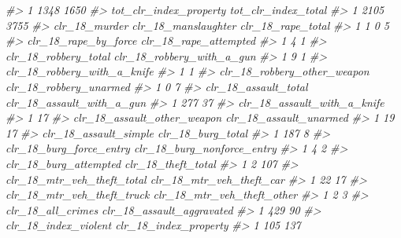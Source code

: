 \documentclass[
]{krantz}
\makeatletter
\newenvironment{Shaded}{\begin{snugshade}}{\end{snugshade}}
\newcommand{\CommentTok}[1]{\textcolor[rgb]{0.37,0.37,0.37}{\textit{#1}}}
\newenvironment{kframe}{%
\medskip{}
\setlength{\fboxsep}{.8em}
 \def\at@end@of@kframe{}%
 \ifinner\ifhmode%
  \def\at@end@of@kframe{\end{minipage}}%
  \begin{minipage}{\columnwidth}%
 \fi\fi%
 \def\FrameCommand##1{\hskip\@totalleftmargin \hskip-\fboxsep
 \colorbox{shadecolor}{##1}\hskip-\fboxsep
     \hskip-\linewidth \hskip-\@totalleftmargin \hskip\columnwidth}%
 \MakeFramed {\advance\hsize-\width
   \@totalleftmargin\z@ \linewidth\hsize
   \@setminipage}}%
 {\par\unskip\endMakeFramed%
 \at@end@of@kframe}
\renewenvironment{Shaded}{\begin{kframe}}{\end{kframe}}
\makeatother
\begin{document}
\begin{Shaded}
\begin{Highlighting}[]
\CommentTok{\#\textgreater{} 1                       1348                  1650}
\CommentTok{\#\textgreater{}   tot\_clr\_index\_property tot\_clr\_index\_total}
\CommentTok{\#\textgreater{} 1                   2105                3755}
\CommentTok{\#\textgreater{}   clr\_18\_murder clr\_18\_manslaughter clr\_18\_rape\_total}
\CommentTok{\#\textgreater{} 1             1                   0                 5}
\CommentTok{\#\textgreater{}   clr\_18\_rape\_by\_force clr\_18\_rape\_attempted}
\CommentTok{\#\textgreater{} 1                    4                     1}
\CommentTok{\#\textgreater{}   clr\_18\_robbery\_total clr\_18\_robbery\_with\_a\_gun}
\CommentTok{\#\textgreater{} 1                    9                         1}
\CommentTok{\#\textgreater{}   clr\_18\_robbery\_with\_a\_knife}
\CommentTok{\#\textgreater{} 1                           1}
\CommentTok{\#\textgreater{}   clr\_18\_robbery\_other\_weapon clr\_18\_robbery\_unarmed}
\CommentTok{\#\textgreater{} 1                           0                      7}
\CommentTok{\#\textgreater{}   clr\_18\_assault\_total clr\_18\_assault\_with\_a\_gun}
\CommentTok{\#\textgreater{} 1                  277                        37}
\CommentTok{\#\textgreater{}   clr\_18\_assault\_with\_a\_knife}
\CommentTok{\#\textgreater{} 1                          17}
\CommentTok{\#\textgreater{}   clr\_18\_assault\_other\_weapon clr\_18\_assault\_unarmed}
\CommentTok{\#\textgreater{} 1                          19                     17}
\CommentTok{\#\textgreater{}   clr\_18\_assault\_simple clr\_18\_burg\_total}
\CommentTok{\#\textgreater{} 1                   187                 8}
\CommentTok{\#\textgreater{}   clr\_18\_burg\_force\_entry clr\_18\_burg\_nonforce\_entry}
\CommentTok{\#\textgreater{} 1                       4                          2}
\CommentTok{\#\textgreater{}   clr\_18\_burg\_attempted clr\_18\_theft\_total}
\CommentTok{\#\textgreater{} 1                     2                107}
\CommentTok{\#\textgreater{}   clr\_18\_mtr\_veh\_theft\_total clr\_18\_mtr\_veh\_theft\_car}
\CommentTok{\#\textgreater{} 1                         22                       17}
\CommentTok{\#\textgreater{}   clr\_18\_mtr\_veh\_theft\_truck clr\_18\_mtr\_veh\_theft\_other}
\CommentTok{\#\textgreater{} 1                          2                          3}
\CommentTok{\#\textgreater{}   clr\_18\_all\_crimes clr\_18\_assault\_aggravated}
\CommentTok{\#\textgreater{} 1               429                        90}
\CommentTok{\#\textgreater{}   clr\_18\_index\_violent clr\_18\_index\_property}
\CommentTok{\#\textgreater{} 1                  105                   137}

\end{Highlighting}
\end{Shaded}
\end{document}
